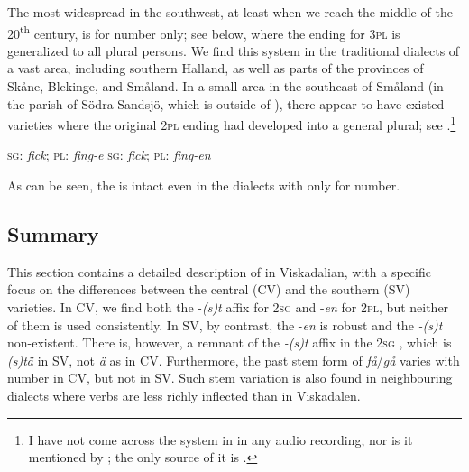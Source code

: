 \documentclass[output=paper,colorlinks,citecolor=brown,draft,draftmode]{langscibook}
\begin{document}
The most widespread  in the  southwest, at least when we reach the middle of the 20\textsuperscript{th} century, is  for number only; see  below, where the ending for 3\textsc{pl} is generalized to all plural persons. We find this system in the traditional dialects of a vast area, including southern Halland, as well as parts of the provinces of Skåne, Blekinge, and Småland. In a small area in the southeast of Småland (in the parish of Södra Sandsjö, which is outside of ), there appear to have existed varieties where the original 2\textsc{pl} ending had developed into a general plural; see .\footnote{I have not come across the system in  in any audio recording, nor is it mentioned by \citet{Horn2015,Horn2017}; the only source of it is \citet{Granstrom1915}.}


\ea\label{ex:petzell:24}
\ea\label{ex:petzell:24a}  \textsc{sg}:  \hspace{\tabcolsep}  \textit{fick};  \hspace{2\tabcolsep}    \textsc{pl:} \hspace{\tabcolsep}  \textit{fing-e}
\ex\label{ex:petzell:24b}  \textsc{sg}:  \hspace{\tabcolsep}  \textit{fick};  \hspace{2\tabcolsep}    \textsc{pl:} \hspace{\tabcolsep}  \textit{fing-en}
\z
\z


As can be seen, the  is intact even in the dialects with  only for number.


\subsection{Summary}\label{sec:petzell:3.3}


This section contains a detailed description of  in Viskadalian, with a specific focus on the differences between the central (CV) and the southern (SV) varieties. In CV, we find both the -\textit{(s)t} affix for 2\textsc{sg} and -\textit{en} for 2\textsc{pl,} but neither of them is used consistently. In SV, by contrast, the -\textit{en} is robust and the \textit{-(s)t} non-existent. There is, however, a remnant of the \textit{-(s)t} affix in the 2\textsc{sg} , which is \textit{(s)tä} in SV, not \textit{ä} as in CV. Furthermore, the past  stem form of \textit{få}/\textit{gå} varies with number in CV, but not in SV. Such stem variation is also found in neighbouring dialects where verbs are less richly inflected than in Viskadalen.
\end{document}
